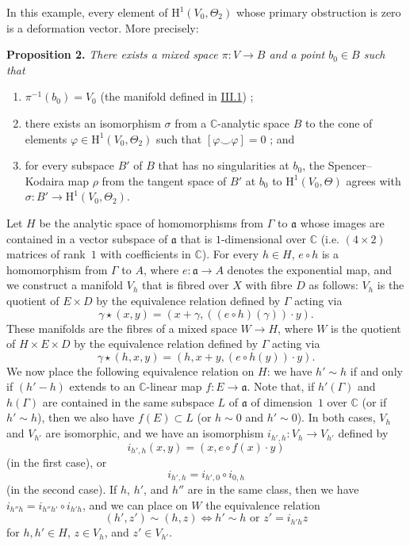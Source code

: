 \documentclass{article}
\newenvironment{itenv}[1]
  {\phantomsection\par\medskip\noindent\textbf{#1.}\itshape}
  {\medskip}
\newcommand{\fk}[1]{{\mathfrak{#1}}}
\newcommand{\CC}{\mathbb{C}}
\newcommand{\HH}{\mathrm{H}}
\newcommand{\oldpage}[1]{\marginpar{\footnotesize$\Big\vert$ \textit{p.~#1}}}
\begin{document}
In this example, every element of $\HH^1(V_0,\Theta_2)$ whose primary obstruction is zero is a deformation vector.
More precisely:

\oldpage{2-07}
\begin{itenv}{Proposition 2}
\label{proposition2}
  There exists a mixed space $\pi\colon V\to B$ and a point $b_0\in B$ such that
  \begin{enumerate}
    \item $\pi^{-1}(b_0)=V_0$ (the manifold defined in \hyperref[III.1]{III.1}) ;
    \item there exists an isomorphism $\sigma$ from a $\CC$-analytic space $B$ to the cone of elements $\varphi\in\HH^1(V_0,\Theta_2)$ such that $[\varphi\smile\varphi]=0$ ; and
    \item for every subspace $B'$ of $B$ that has no singularities at $b_0$, the Spencer--Kodaira map $\rho$ from the tangent space of $B'$ at $b_0$ to $\HH^1(V_0,\Theta)$ agrees with $\sigma\colon B'\to\HH^1(V_0,\Theta_2)$.
  \end{enumerate}
\end{itenv}

Let $H$ be the analytic space of homomorphisms from $\Gamma$ to $\fk{a}$ whose images are contained in a vector subspace of $\fk{a}$ that is $1$-dimensional over $\CC$ (i.e. $(4\times2)$ matrices of rank~$1$ with coefficients in $\CC$).
For every $h\in H$, $e\circ h$ is a homomorphism from $\Gamma$ to $A$, where $e\colon\fk{a}\to A$ denotes the exponential map, and we construct a manifold $V_h$ that is fibred over $X$ with fibre $D$ as follows: $V_h$ is the quotient of $E\times D$ by the equivalence relation defined by $\Gamma$ acting via
\[
  \gamma\star(x,y) = (x+\gamma,((e\circ h)(\gamma))\cdot y).
\]
These manifolds are the fibres of a mixed space $W\to H$, where $W$ is the quotient of $H\times E\times D$ by the equivalence relation defined by $\Gamma$ acting via
\[
  \gamma\star(h,x,y) = (h,x+y,(e\circ h(y))\cdot y).
\]
We now place the following equivalence relation on $H$: we have $h'\sim h$ if and only if $(h'-h)$ extends to an $\CC$-linear map $f\colon E\to\fk{a}$.
Note that, if $h'(\Gamma)$ and $h(\Gamma)$ are contained in the same subspace $L$ of $\fk{a}$ of dimension~$1$ over $\CC$ (or if $h'\sim h$), then we also have $f(E)\subset L$ (or $h\sim0$ and $h'\sim0$).
In both cases, $V_h$ and $V_{h'}$ are isomorphic, and we have an isomorphism $i_{h',h}\colon V_h\to V_{h'}$ defined by
\[
  i_{h',h}(x,y) = (x,e\circ f(x)\cdot y)
\]
(in the first case), or
\[
  i_{h',h} = i_{h',0}\circ i_{0,h}
\]
(in the second case).
\oldpage{4-08}
If $h$, $h'$, and $h''$ are in the same class, then we have $i_{h''h}=i_{h''h'}\circ i_{h'h}$, and we can place on $W$ the equivalence relation
\[
  (h',z') \sim (h,z) \iff \mbox{$h'\sim h$ or $z'=i_{h'h}z$}
\]
for $h,h'\in H$, $z\in V_h$, and $z'\in V_{h'}$.
\end{document}
